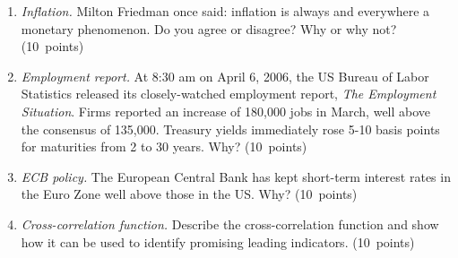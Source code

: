 \documentclass[letterpaper,12pt]{article}
\begin{document}
\begin{enumerate}
\begin{enumerate}
\item {\it Inflation.\/}
Milton Friedman once said:  inflation is always and everywhere a monetary phenomenon. 
Do you agree or disagree?  Why or why not?  (10~points)

\item {\it Employment report.\/} 
At 8:30 am on April 6, 2006, 
the US Bureau of Labor Statistics released
its closely-watched employment report, {\it The Employment Situation\/}.
Firms reported an increase of 180,000 jobs in March, 
well above the consensus of 135,000.  
Treasury yields immediately rose 5-10 basis points 
for maturities from 2 to 30 years.  
Why?  
(10~points)

\item {\it ECB policy.\/}
The European Central Bank has kept short-term interest rates
in the Euro Zone well above those in the US.
Why?  (10~points)

\item {\it Cross-correlation function.\/}
Describe the cross-correlation function and show how it can 
be used to identify promising leading indicators.
(10~points) 

\end{enumerate}

\begin{comment}
Answers.
\begin{enumerate}

\item   PPP suggests that exchange rates will adjust to make prices the same across countries. In
this case, that means the dollar will rise against the euro, fall against the yen.  Is this right?
Over short periods of time, exchange rates are close to unpredictable by any means, PPP included.
Over longer periods of time (5-20 years) PPP is a reasonable indicator.  

\item It has lots of truth in it, but I'd disagree for two reasons. 
First, it's an incomplete statement for high inflations: 
it's true, but high money growth itself typically stems from 
a government deficit.
Second, over short periods of time, the quantity theory doesn't work 
that well.  
It's entirely possible, as our AS/AD analysis implies, that 
money can have only a modest short-run impact on inflation, 
and that other demand and supply factors play a role, too.  

\item  I'd start with the Taylor rule:  indicators of high output 
lead to high interest rates.
The deeper question is why this shows up in long yields.
Certainly it will take some time to affect the Fed's choice of 
target interest rate, but the impact on the very long end is a 
typical, if somewhat mysterious, result.  


\end{comment}
\end{enumerate}
\end{document}
